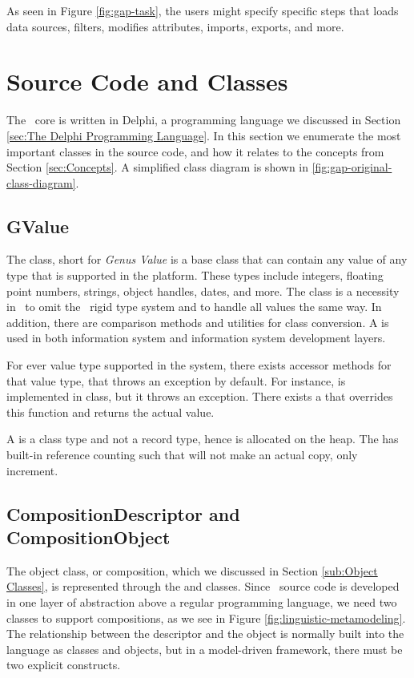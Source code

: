 As seen in Figure \ref{fig:gap-task}, the users might specify specific steps that loads data sources, filters, modifies attributes, imports, exports, and more.

\section{Source Code and Classes}
\label{sec:Source Code and Classes}
The \gap~core is written in Delphi, a programming language we discussed in Section \ref{sec:The Delphi Programming Language}. In this section we enumerate the most important classes in the source code, and how it relates to the concepts from Section \ref{sec:Concepts}. A simplified class diagram is shown in \ref{fig:gap-original-class-diagram}.

\subsection{GValue}
\label{sub:GValue}
The  class, short for \textit{Genus Value} is a base class that can contain any value of any type that is supported in the platform. These types include integers, floating point numbers, strings, object handles, dates, and more. The  class is a necessity in \gap~to omit the \delphi~rigid type system and to handle all values the same way. In addition, there are comparison methods and utilities for class conversion. A  is used in both information system and information system development layers.

For ever value type supported in the system, there exists accessor methods for that value type, that throws an exception by default. For instance,  is implemented in  class, but it throws an exception. There exists a  that overrides this function and returns the actual value.

A  is a class type and not a record type, hence is allocated on the heap. The  has built-in reference counting such that  will not make an actual copy, only increment.


\subsection{CompositionDescriptor and CompositionObject}
\label{sub:CompositionDescriptor}
The object class, or composition, which we discussed in Section \ref{sub:Object Classes}, is represented through the  and  classes. Since \gap~source code is developed in one layer of abstraction above a regular programming language, we need two classes to support compositions, as we see in Figure \ref{fig:linguistic-metamodeling}. The relationship between the descriptor and the object is normally built into the language as classes and objects, but in a model-driven framework, there must be two explicit constructs.

